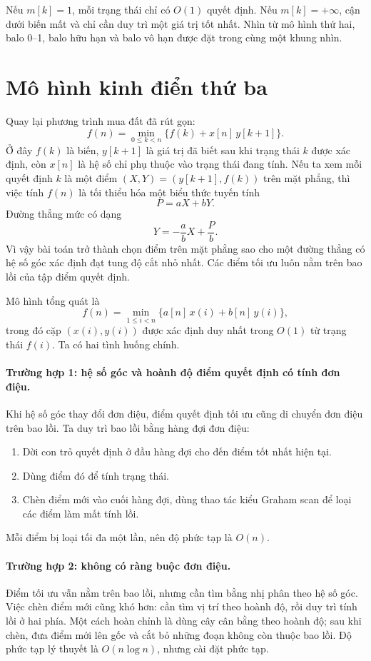 \documentclass[11pt]{article}
\begin{document}
Nếu $m[k]=1$, mỗi trạng thái chỉ có $O(1)$ quyết định. Nếu $m[k]=+\infty$,
cận dưới biến mất và chỉ cần duy trì một giá trị tốt nhất. Nhìn từ mô hình
thứ hai, balo 0--1, balo hữu hạn và balo vô hạn được đặt trong cùng một khung
nhìn.

\section{Mô hình kinh điển thứ ba}

Quay lại phương trình mua đất đã rút gọn:
\[
  f(n)=\min_{0\le k<n}\{f(k)+x[n]\,y[k+1]\}.
\]
Ở đây $f(k)$ là biến, $y[k+1]$ là giá trị đã biết sau khi trạng thái $k$ được
xác định, còn $x[n]$ là hệ số chỉ phụ thuộc vào trạng thái đang tính. Nếu ta
xem mỗi quyết định $k$ là một điểm $(X,Y)=(y[k+1],f(k))$ trên mặt phẳng, thì
việc tính $f(n)$ là tối thiểu hóa một biểu thức tuyến tính
\[
  P=aX+bY.
\]
Đường thẳng mức có dạng
\[
  Y=-\frac{a}{b}X+\frac{P}{b}.
\]
Vì vậy bài toán trở thành chọn điểm trên mặt phẳng sao cho một đường thẳng có
hệ số góc xác định đạt tung độ cắt nhỏ nhất. Các điểm tối ưu luôn nằm trên
bao lồi của tập điểm quyết định.

Mô hình tổng quát là
\[
  f(n)=\min_{1\le i<n}\{a[n]\,x(i)+b[n]\,y(i)\},
\]
trong đó cặp $(x(i),y(i))$ được xác định duy nhất trong $O(1)$ từ trạng thái
$f(i)$. Ta có hai tình huống chính.

\paragraph{Trường hợp 1: hệ số góc và hoành độ điểm quyết định có tính đơn
điệu.}
Khi hệ số góc thay đổi đơn điệu, điểm quyết định tối ưu cũng di chuyển đơn
điệu trên bao lồi. Ta duy trì bao lồi bằng hàng đợi đơn điệu:
\begin{enumerate}
  \item Dời con trỏ quyết định ở đầu hàng đợi cho đến điểm tốt nhất hiện tại.
  \item Dùng điểm đó để tính trạng thái.
  \item Chèn điểm mới vào cuối hàng đợi, dùng thao tác kiểu Graham scan để
  loại các điểm làm mất tính lồi.
\end{enumerate}
Mỗi điểm bị loại tối đa một lần, nên độ phức tạp là $O(n)$.

\paragraph{Trường hợp 2: không có ràng buộc đơn điệu.}
Điểm tối ưu vẫn nằm trên bao lồi, nhưng cần tìm bằng nhị phân theo hệ số góc.
Việc chèn điểm mới cũng khó hơn: cần tìm vị trí theo hoành độ, rồi duy trì
tính lồi ở hai phía. Một cách hoàn chỉnh là dùng cây cân bằng theo hoành độ;
sau khi chèn, đưa điểm mới lên gốc và cắt bỏ những đoạn không còn thuộc bao
lồi. Độ phức tạp lý thuyết là $O(n\log n)$, nhưng cài đặt phức tạp.
\end{document}
